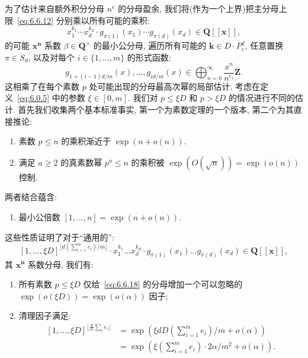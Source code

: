 为了估计来自额外积分分母 $n^e$ 的分母盈余, 我们将(作为一个上界)把主分母上限~\eqref{eq:6.6.12} 分别乘以所有可能的乘积:
\[ x_1^{k_1} \cdots x_d^{k_d} \cdot g_{\pi(1)}(x_1) \cdots g_{\pi(d)}(x_d) \in \mathbf{Q}[\![\mathbf{x}]\!], \]
的可能 $\mathbf{x}^{\mathbf{n}}$ 系数 $\beta \in \mathbf{Q}^{\times}$ 的最小公分母, 遍历所有可能的 $\mathbf{k} \in D \cdot P^d_{\epsilon}$, 任意置换 $\pi \in S_d$, 以及对每个 $i \in \{1, \dots, m\}$ 的形式函数:
\begin{equation}\label{eq:6.6.17}
g_{1+(i-1)d/m}(x), \dots, g_{id/m}(x) \in \bigoplus_{n=0}^{\infty} \frac{x^n}{n^{e_i}} \mathbf{Z}.
\end{equation}
这相乘了在每个素数 $p$ 处可能出现的分母最高次幂的局部估计.
考虑在定义~\eqref{eq:6.0.5} 中的参数 $\xi \in [0, m]$.
我们对 $p \leq \xi D$ 和 $p > \xi D$ 的情况进行不同的估计.
首先我们收集两个基本标准事实, 第一个为素数定理的一个版本, 第二个为其直接推论:
\begin{enumerate}
  \item[(a)] 素数 $p \le n$ 的乘积渐近于 $\exp(n + o(n))$.
  \item[(b)] 满足 $a \ge 2$ 的真素数幂 $p^a \le n$ 的乘积被 $\exp(O(\sqrt{n})) = \exp(o(n))$ 控制.
\end{enumerate}
两者结合蕴含:
\begin{enumerate}
  \item[(c)] 最小公倍数 $[1, \dots, n] = \exp(n + o(n))$.
\end{enumerate}

这些性质证明了对于``通用的'':
\begin{equation}\label{eq:6.6.18}
[1, \dots, \xi D]^{\lfloor d \left( \sum_{i=1}^{m} e_i \right) / m \rfloor} \cdot x_1^{k_1} \dots x_d^{k_d} \cdot g_{\pi(1)}(x_1) \dots g_{\pi(d)}(x_d) \in \mathbf{Q}[\![\mathbf{x}]\!],
\end{equation}
其 $\mathbf{x}^{\mathbf{n}}$ 系数分母, 我们有:
\begin{enumerate}
  \item[(i)] 所有素数 $p \le \xi D$ 仅给~\eqref{eq:6.6.18} 的分母增加一个可以忽略的 $\exp(o(\xi D)) = \exp(o(\alpha))$ 因子;
  \item[(ii)] 清理因子满足:
  \[
\begin{aligned}
[1, \dots, \xi D]^{\lfloor \frac{d}{m} \sum_i e_i \rfloor} 
&= \exp\left(\xi dD\left(\sum_{i=1}^m e_i\right)/m + o(\alpha)\right) \\
&= \exp\left(\xi\left(\sum_{i=1}^m e_i\right) \cdot 2\alpha/m^2 + o(\alpha)\right).
\end{aligned}
\]
\end{enumerate}

